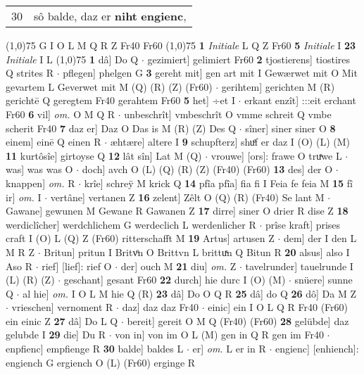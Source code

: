 \documentclass[8pt,a4paper,notitlepage]{article}
\begin{document}
\begin{table}[ht]
\begin{minipage}[t]{0.5\linewidth}
\begin{tabular}{rl}
30 & sô balde, daz er \textbf{niht} \textbf{engienc},\\ 
\end{tabular}
\scriptsize
\line(1,0){75} \newline
G I O L M Q R Z Fr40 Fr60 \newline
\line(1,0){75} \newline
\textbf{1} \textit{Initiale} L Q Z Fr60  \textbf{5} \textit{Initiale} I  \textbf{23} \textit{Initiale} I L  \newline
\line(1,0){75} \newline
\textbf{1} dâ] Do Q  $\cdot$ gezimiert] gelimiert Fr60 \textbf{2} tjostierens] tiostires Q strites R  $\cdot$ pflegen] phelgen G \textbf{3} gereht mit] gen art mit I Gewærwet mit O Mit gevartem L Geverwet mit M (Q) (R) (Z) (Fr60)  $\cdot$ gerihtem] gerichten M (R) gerichtē Q geregtem Fr40 gerahtem Fr60 \textbf{5} het] ÷et I  $\cdot$ erkant enzît] :::eit erchant Fr60 \textbf{6} vil] \textit{om.} O M Q R  $\cdot$ unbeschrît] vmbeschrît O vmme schreit Q vmbe scherit Fr40 \textbf{7} daz er] Daz O Das is M (R) (Z) Des Q  $\cdot$ sîner] siner siner O \textbf{8} einem] einē Q einen R  $\cdot$ æhtære] altere I \textbf{9} schupfterz] shuͤf er daz I (O) (L) (M) \textbf{11} kurtôsîe] girtoyse Q \textbf{12} lât sîn] Lat M (Q)  $\cdot$ vrouwe] [ors]: frawe O truͯwe L  $\cdot$ was] was was O  $\cdot$ doch] avch O (L) (Q) (R) (Z) (Fr40) (Fr60) \textbf{13} des] der O  $\cdot$ knappen] \textit{om.} R  $\cdot$ krîe] schreÿ M krick Q \textbf{14} pfîa pfîa] fia fi I Feia fe feia M \textbf{15} fî ir] \textit{om.} I  $\cdot$ vertâne] vertanen Z \textbf{16} zelent] Zêlt O (Q) (R) (Fr40) Se lant M  $\cdot$ Gawane] gewunen M Gewane R Gawanen Z \textbf{17} dirre] siner O drier R dise Z \textbf{18} werdiclîcher] werdchlichem G werdeclich L werdenlicher R  $\cdot$ prîse kraft] prises craft I (O) L (Q) Z (Fr60) ritterschafft M \textbf{19} Artus] artusen Z  $\cdot$ dem] der I den L M R Z  $\cdot$ Britun] pritun I Britvͦn O Brittvn L brittuͯn Q Bitun R \textbf{20} alsus] also I Aso R  $\cdot$ rief] [lief]: rief O  $\cdot$ der] ouch M \textbf{21} diu] \textit{om.} Z  $\cdot$ tavelrunder] tauelrunde I (L) (R) (Z)  $\cdot$ geschant] gesant Fr60 \textbf{22} durch] hie durc I (O) (M)  $\cdot$ snüere] sunne Q  $\cdot$ al hie] \textit{om.} I O L M hie Q (R) \textbf{23} dâ] Do O Q R \textbf{25} dâ] do Q \textbf{26} dô] Da M Z  $\cdot$ vrieschen] vernoment R  $\cdot$ daz] daz daz Fr40  $\cdot$ einic] ein I O L Q R Fr40 (Fr60) ein einic Z \textbf{27} dâ] Do L Q  $\cdot$ bereit] gereit O M Q (Fr40) (Fr60) \textbf{28} gelübde] daz gelubde I \textbf{29} die] Du R  $\cdot$ von in] von im O L (M) gen in Q R gen im Fr40  $\cdot$ enpfienc] empfienge R \textbf{30} balde] baldes L  $\cdot$ er] \textit{om.} L er in R  $\cdot$ engienc] [enhiench]: engiench G ergiench O (L) (Fr60) erginge R \newline

\end{minipage}
\end{table}
\end{document}
